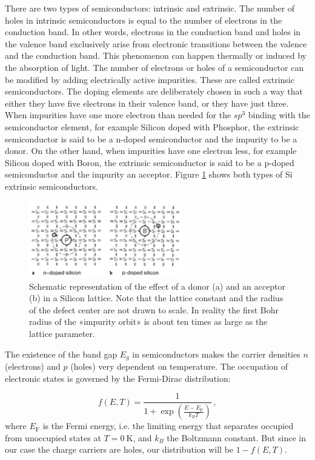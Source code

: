 \documentclass[11pt,a4paper]{article}
\begin{document}
There are two types of semiconductors: intrinsic and extrinsic. The number of holes in intrinsic semiconductors is equal to the number of electrons in the conduction band. In other words, electrons in the conduction band and holes in the valence band exclusively arise from electronic transitions between the valence and the conduction band. This phenomenon can happen thermally or induced by the absorption of light. The number of electrons or holes of a semiconductor can be modified by adding electrically active impurities. These are called extrinsic semiconductors. The doping elements are deliberately chosen in such a way that either they have five electrons in their valence band, or they have just three. When impurities have one more electron than needed for the $sp^3$ binding with the semiconductor element, for example Silicon doped with Phosphor, the extrinsic semiconductor is said to be a n-doped semiconductor and the impurity to be a donor. On the other hand, when impurities have one electron less, for example Silicon doped with Boron, the extrinsic semiconductor is said to be a p-doped semiconductor and the impurity an acceptor. Figure \ref{fig:extrinsic_semiconductors} shows both types of Si extrinsic semiconductors.

\begin{figure}[ht]
\centering
\includegraphics[width=0.6\textwidth]{extrinsic_semiconductors}
\caption{Schematic representation of the effect of a donor (a) and an acceptor (b) in a Silicon lattice. Note that the lattice constant and the radius of the defect center are not drawn to scale. In reality the first Bohr radius of the «impurity orbit» is about ten times as large as the lattice parameter.\cite{ibach2009solid}}
\label{fig:extrinsic_semiconductors}
\end{figure}

The existence of the band gap $E_g$ in semiconductors makes the carrier densities $n$ (electrons) and $p$ (holes) very dependent on temperature. The occupation of electronic states is governed by the Fermi-Dirac distribution:

\begin{equation}\label{eq:Fermi-Dirac}
f(E,T)=\frac{1}{1+\exp\left(\frac{E-E_\text{F}}{k_BT}\right)}\,,
\end{equation}
where $E_\text{F}$ is the Fermi energy, i.e. the limiting energy that separates occupied from unoccupied states at $T=\SI{0}{\kelvin}$, and $k_B$ the Boltzmann constant. But since in our case the charge carriers are holes, our distribution will be $1-f(E,T)$.
\end{document}
